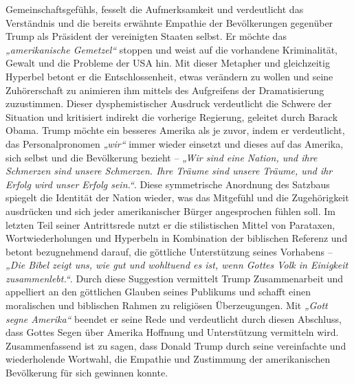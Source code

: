 Gemeinschaftsgefühls, fesselt die Aufmerksamkeit und verdeutlicht das Verständnis und die bereits 
erwähnte Empathie der Bevölkerungen gegenüber Trump als Präsident der vereinigten Staaten selbst. 
Er möchte das \textit{„amerikanische Gemetzel“} stoppen und weist auf die vorhandene Kriminalität, Gewalt und 
die Probleme der USA hin. Mit dieser Metapher und gleichzeitig Hyperbel betont er die 
Entschlossenheit, etwas verändern zu wollen und seine Zuhörerschaft zu animieren ihm mittels des 
Aufgreifens der Dramatisierung zuzustimmen. Dieser dysphemistischer Ausdruck verdeutlicht die 
Schwere der Situation und kritisiert indirekt die vorherige Regierung, geleitet durch Barack Obama. 
Trump möchte ein besseres Amerika als je zuvor, indem er verdeutlicht, das Personalpronomen \textit{„wir“} 
immer wieder einsetzt und dieses auf das Amerika, sich selbst und die Bevölkerung bezieht – \textit{„Wir sind eine Nation, und ihre Schmerzen sind unsere Schmerzen. Ihre Träume sind unsere Träume, und ihr Erfolg wird unser Erfolg sein.“}. Diese symmetrische Anordnung des Satzbaus spiegelt die Identität der Nation wieder, was das Mitgefühl und die Zugehörigkeit ausdrücken und sich jeder amerikanischer 
Bürger angesprochen fühlen soll. Im letzten Teil seiner Antrittsrede nutzt er die stilistischen 
Mittel von Parataxen, Wortwiederholungen und Hyperbeln in Kombination der biblischen Referenz und 
betont bezugnehmend darauf, die göttliche Unterstützung seines Vorhabens – \textit{„Die Bibel zeigt uns, 
wie gut und wohltuend es ist, wenn Gottes Volk in Einigkeit zusammenlebt.“}. Durch diese Suggestion 
vermittelt Trump Zusammenarbeit und appelliert an den göttlichen Glauben seines Publikums und schafft 
einen moralischen und biblischen Rahmen zu religiösen Überzeugungen. Mit \textit{„Gott segne Amerika“} beendet 
er seine Rede und verdeutlicht durch diesen Abschluss, dass Gottes Segen über Amerika Hoffnung und 
Unterstützung vermitteln wird. \\Zusammenfassend ist zu sagen, dass Donald Trump durch seine 
vereinfachte und wiederholende Wortwahl, die Empathie und Zustimmung der amerikanischen Bevölkerung 
für sich gewinnen konnte.

